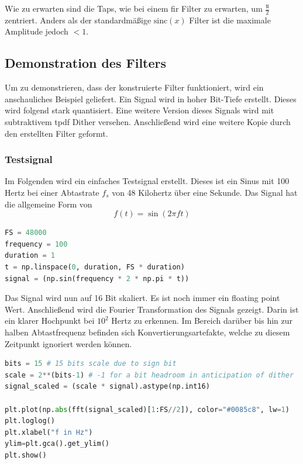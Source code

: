 Wie zu erwarten sind die Taps, wie bei einem \gls{fir} Filter zu
erwarten, um \(\frac{\texttt{N}}{2}\) zentriert. Anders als der
standardmäßige \(\text{sinc} (x)\) Filter ist die maximale Amplitude
jedoch \(<1\).

\hypertarget{demonstration-des-filters}{%
\subsection{Demonstration des Filters}\label{demonstration-des-filters}}

Um zu demonstrieren, dass der konstruierte Filter funktioniert, wird ein
anschauliches Beispiel geliefert. Ein Signal wird in hoher Bit-Tiefe
erstellt. Dieses wird folgend stark quantisiert. Eine weitere Version
dieses Signals wird mit subtraktivem \gls{tpdf} Dither versehen.
Anschließend wird eine weitere Kopie durch den erstellten Filter
geformt.

\hypertarget{testsignal}{%
\subsubsection{Testsignal}\label{testsignal}}

Im Folgenden wird ein einfaches Testsignal erstellt. Dieses ist ein
Sinus mit 100 Hertz bei einer Abtastrate \(f_s\) von 48 Kilohertz über
eine Sekunde. Das Signal hat die allgemeine Form von
\[f(t) = \sin (2 \pi f t)\]

\begin{lstlisting}[language=Python]
FS = 48000
frequency = 100
duration = 1
t = np.linspace(0, duration, FS * duration)
signal = (np.sin(frequency * 2 * np.pi * t))
\end{lstlisting}

Das Signal wird nun auf 16 Bit skaliert. Es ist noch immer ein
\gls{floating point} Wert. Anschließend wird die Fourier Transformation
des Signals gezeigt. Darin ist ein klarer Hochpunkt bei \(10^2\) Hertz
zu erkennen. Im Bereich darüber bis hin zur halben Abtastfrequenz
befinden sich Konvertierungsartefakte, welche zu diesem Zeitpunkt
ignoriert werden können.

\begin{lstlisting}[language=Python]
bits = 15 # 15 bits scale due to sign bit
scale = 2**(bits-1) # -1 for a bit headroom in anticipation of dither
signal_scaled = (scale * signal).astype(np.int16)

plt.plot(np.abs(fft(signal_scaled)[1:FS//2]), color="#0085c8", lw=1)
plt.loglog()
plt.xlabel("f in Hz")
ylim=plt.gca().get_ylim()
plt.show()
\end{lstlisting}

